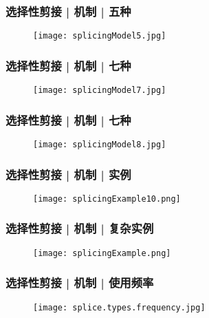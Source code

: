 \begin{frame}
  \frametitle{选择性剪接 | \alert{机制} | 五种}
  \begin{figure}
    \centering
    \texttt{[image: splicingModel5.jpg]}
  \end{figure}
\end{frame}

\begin{frame}
  \frametitle{选择性剪接 | \alert{机制} | 七种}
  \begin{figure}
    \centering
    \texttt{[image: splicingModel7.jpg]}
  \end{figure}
\end{frame}

\begin{frame}
  \frametitle{选择性剪接 | \alert{机制} | 七种}
  \begin{figure}
    \centering
    \texttt{[image: splicingModel8.jpg]}
  \end{figure}
\end{frame}

\begin{frame}
  \frametitle{选择性剪接 | 机制 | 实例}
  \begin{figure}
    \centering
    \texttt{[image: splicingExample10.png]}
  \end{figure}
\end{frame}

\begin{frame}
  \frametitle{选择性剪接 | 机制 | 复杂实例}
  \begin{figure}
    \centering
    \texttt{[image: splicingExample.png]}
  \end{figure}
\end{frame}

\begin{frame}
  \frametitle{选择性剪接 | 机制 | 使用频率}
  \begin{figure}
    \centering
    \texttt{[image: splice.types.frequency.jpg]}
  \end{figure}
\end{frame}

